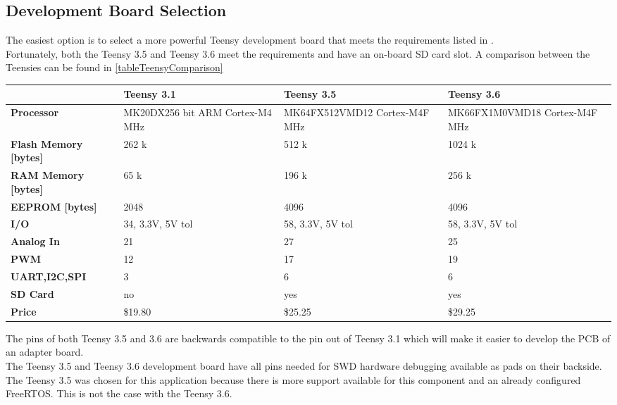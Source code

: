 \subsection{Development Board Selection}
The easiest option is to select a more powerful Teensy development board that meets the requirements listed in . \\
Fortunately, both the Teensy 3.5 and Teensy 3.6 meet the requirements and have an on-board SD card slot. A comparison between the Teensies can be found in \autoref{tableTeensyComparison}
%
\begin{table}[h]
    \begin{center}
        \begin{tabular}{l|L{4cm}L{4cm}L{4cm}}
             & \textbf{Teensy 3.1} & \textbf{Teensy 3.5} & \textbf{Teensy 3.6} \\
             \hline
            \textbf{Processor} & MK20DX256  bit ARM \newline Cortex-M4  MHz & 
            MK64FX512VMD12 \newline Cortex-M4F  MHz & 
            MK66FX1M0VMD18 \newline Cortex-M4F  MHz \\
            \textbf{Flash Memory [bytes]} & 262 k & 512 k & 1024 k \\
            \textbf{RAM Memory [bytes]} & 65 k & 196 k & 256 k \\
            \textbf{EEPROM [bytes]}	 & 2048 & 4096 & 4096 \\
            \textbf{I/O} & 34, 3.3V, 5V tol & 58, 3.3V, 5V tol & 58, 3.3V, 5V tol \\
            \textbf{Analog In} & 21 & 27 & 25 \\
            \textbf{PWM} & 12 & 17 & 19 \\
            \textbf{UART,I2C,SPI} & 3 & 6 & 6 \\
            \textbf{SD Card} & no & yes & yes \\
            \textbf{Price} & \$19.80 & \$25.25 & \$29.25 \\
        \end{tabular}
    \end{center}
    \label{tableTeensyComparison}
\end{table}
%
The pins of both Teensy 3.5 and 3.6 are backwards compatible to the pin out of Teensy 3.1 which will make it easier to develop the PCB of an adapter board. \\
The Teensy 3.5 and Teensy 3.6 development board have all pins needed for SWD hardware debugging available as pads on their backside. \\
The Teensy 3.5 was chosen for this application because there is more support available for this component and an already configured FreeRTOS. This is not the case with the Teensy 3.6.\\
%
%
